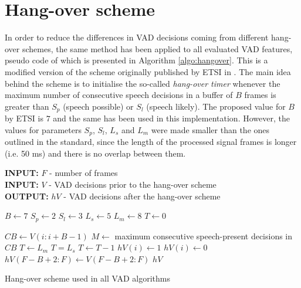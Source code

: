 
\section{Hang-over scheme}
\label{sec:hang}

In order to reduce the differences in VAD decisions coming from different hang-over schemes, the same method has been applied to all evaluated VAD features, pseudo code of which is presented in Algorithm \ref{algo:hangover}. This is a modified version of the scheme originally published by ETSI in \cite{ETSIHangover}. The main idea behind the scheme is to initialise the so-called \emph{hang-over timer} whenever the maximum number of consecutive speech decisions in a buffer of $B$ frames is greater than $S_p$ (speech possible) or $S_l$ (speech likely). The proposed value for $B$ by ETSI is $7$ and the same has been used in this implementation. However, the values for parameters $S_p$, $S_l$, $L_s$ and $L_m$ were made smaller than the ones outlined in the standard, since the length of the processed signal frames is longer (i.e. 50 ms) and there is no overlap between them.

\begin{algorithm}
\textbf{INPUT:} $F$ - number of frames \\
\textbf{INPUT:} $V$ - VAD decisions prior to the hang-over scheme \\
\textbf{OUTPUT:} $hV$ - VAD decisions after the hang-over scheme
\begin{algorithmic}[1]
\STATE $B \leftarrow 7$ 
\STATE $S_p \leftarrow 2$  
\STATE $S_l \leftarrow 3$ 
\STATE $L_s \leftarrow 5$ 
\STATE $L_m \leftarrow 8$ 
\STATE
\STATE $T \leftarrow 0$ 

\STATE $CB \leftarrow V(i:i+B-1)$ 
\STATE $M \leftarrow$ maximum consecutive speech-present decisions in $CB$
\STATE $T \leftarrow L_m$
\STATE $T = L_s$
\STATE $T \leftarrow T-1$
\ENDIF
{}
\STATE $hV(i) \leftarrow 1$
\ELSE
\STATE $hV(i) \leftarrow 0$
\ENDIF
\ENDFOR
\STATE $hV(F-B+2:F) \leftarrow V(F-B+2:F)$ 
\RETURN $hV$
\end{algorithmic}
\caption{Hang-over scheme used in all VAD algorithms}
\label{algo:hangover}
\end{algorithm}

